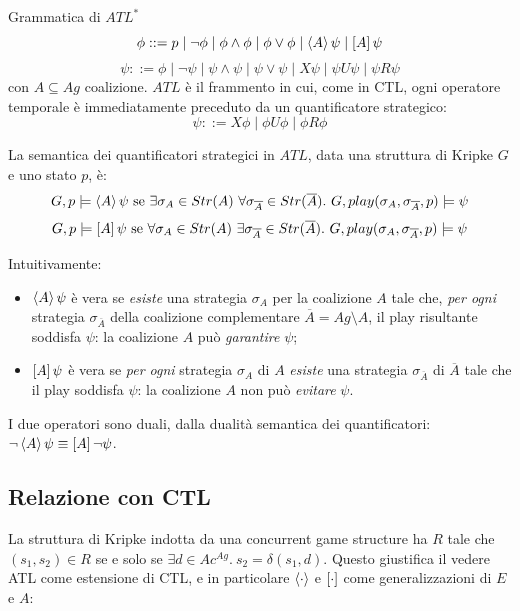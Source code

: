 \begin{definition}{Grammatica di \(ATL^*\)}
  \[\phi ::= p \mid \neg \phi \mid \phi \land \phi \mid \phi \lor \phi \mid \GDia[A]\psi \mid \GBox[A] \psi\]
  \[\psi ::= \phi \mid \neg \psi \mid \psi \land \psi \mid \psi \lor \psi \mid X\psi \mid \psi U\psi \mid \psi R \psi\]
  con \(A \subseteq Ag\) coalizione. \(ATL\) è il frammento in cui, come in CTL, ogni operatore temporale è immediatamente preceduto da un quantificatore strategico:
  \[\psi ::= X\phi \mid \phi U\phi \mid \phi R \phi\]
  
  La semantica dei quantificatori strategici in \(ATL\), data una struttura di Kripke \(G\) e uno stato \(p\), è:
  \[G,p\models \GDia[A] \psi \text{ se } \exists \sigma_A \in Str(A)\ \forall \sigma_{\overline{A}} \in Str(\overline{A}).\ G,play(\sigma_A,\sigma_{\overline{A}},p)\models \psi \]
  \[G,p\models \GBox[A] \psi \text{ se } \forall \sigma_A \in Str(A)\ \exists \sigma_{\overline{A}} \in Str(\overline{A}).\ G,play(\sigma_A,\sigma_{\overline{A}},p)\models \psi \]
\end{definition}
Intuitivamente:
\begin{itemize}
\item \(\GDia[A] \psi\) è vera se \emph{esiste} una strategia \(\sigma_A\) per la coalizione \(A\) tale che, \emph{per ogni} strategia \(\sigma_{\overline{A}}\) della coalizione complementare \(\overline{A} = Ag\setminus A\), il play risultante soddisfa \(\psi\): la coalizione \(A\) può \emph{garantire} \(\psi\);
\item \(\GBox[A] \psi\) è vera se \emph{per ogni} strategia \(\sigma_A\) di \(A\) \emph{esiste} una strategia \(\sigma_{\overline{A}}\) di \(\overline{A}\) tale che il play soddisfa \(\psi\): la coalizione \(A\) non può \emph{evitare} \(\psi\).
\end{itemize}

I due operatori sono duali, dalla dualità semantica dei quantificatori: \(\neg \GDia[A]\psi \equiv \GBox[A] \neg \psi\).

\subsection{Relazione con CTL}

La struttura di Kripke indotta da una concurrent game structure ha \(R\) tale che \((s_1,s_2) \in R\) se e solo se \(\exists d \in Ac^{Ag}.\ s_2 = \delta(s_1,d)\). Questo giustifica il vedere ATL come estensione di CTL, e in particolare \(\GDia\) e \(\GBox\) come generalizzazioni di \(E\) e \(A\):


